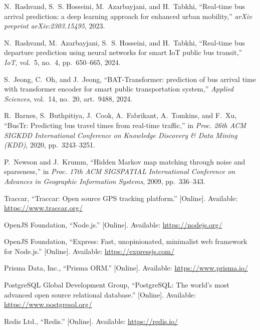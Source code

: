 \begin{enumerate}[label={[\arabic*]}, leftmargin=1.2cm, itemsep=6pt]
  \item N.~Rashvand, S.~S. Hosseini, M.~Azarbayjani, and H.~Tabkhi,
  ``Real-time bus arrival prediction: a deep learning approach for
  enhanced urban mobility,'' \emph{arXiv preprint arXiv:2303.15495},
  2023.

  \item N.~Rashvand, M.~Azarbayjani, S.~S. Hosseini, and H.~Tabkhi,
  ``Real-time bus departure prediction using neural networks for smart
  IoT public bus transit,'' \emph{IoT}, vol.~5, no.~4, pp.~650--665,
  2024.

  \item S.~Jeong, C.~Oh, and J.~Jeong, ``BAT-Transformer: prediction of
  bus arrival time with transformer encoder for smart public
  transportation system,'' \emph{Applied Sciences}, vol.~14, no.~20,
  art.~9488, 2024.

  \item R.~Barnes, S.~Buthpitiya, J.~Cook, A.~Fabrikant, A.~Tomkins, and
  F.~Xu, ``BusTr: Predicting bus travel times from real-time traffic,''
  in \emph{Proc. 26th ACM SIGKDD International Conference on Knowledge
  Discovery \& Data Mining (KDD)}, 2020, pp.~3243--3251.

  \item P.~Newson and J.~Krumm, ``Hidden Markov map matching through
  noise and sparseness,'' in \emph{Proc. 17th ACM SIGSPATIAL
  International Conference on Advances in Geographic Information
  Systems}, 2009, pp.~336--343.

  \item Traccar, ``Traccar: Open source GPS tracking platform.''
  [Online]. Available: \url{https://www.traccar.org/}

  \item OpenJS Foundation, ``Node.js.'' [Online]. Available:
  \url{https://nodejs.org/}

  \item OpenJS Foundation, ``Express: Fast, unopinionated, minimalist
  web framework for Node.js.'' [Online]. Available:
  \url{https://expressjs.com/}

  \item Prisma Data, Inc., ``Prisma ORM.'' [Online]. Available:
  \url{https://www.prisma.io/}

  \item PostgreSQL Global Development Group, ``PostgreSQL: The world's
  most advanced open source relational database.'' [Online]. Available:
  \url{https://www.postgresql.org/}

  \item Redis Ltd., ``Redis.'' [Online]. Available:
  \url{https://redis.io/}


\end{enumerate}

